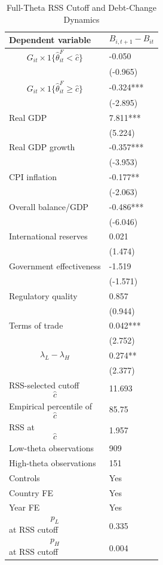 \begin{table}[H]\centering
\begin{threeparttable}
\caption{Full-Theta RSS Cutoff and Debt-Change Dynamics}
\label{tab:deltaB_rss_cutoff_fulltheta}
\scriptsize
\begin{tabularx}{\textwidth}{lY}
\toprule
Dependent variable & $$B_{i,t+1}-B_{it}$$ \\
\midrule
$$G_{it}\times 1\{\widehat{\theta}^{F}_{it}<\widehat{c}\}$$ & -0.050 \\
 & (-0.965) \\
$$G_{it}\times 1\{\widehat{\theta}^{F}_{it}\geq\widehat{c}\}$$ & -0.324*** \\
 & (-2.895) \\
Real GDP & 7.811*** \\
 & (5.224) \\
Real GDP growth & -0.357*** \\
 & (-3.953) \\
CPI inflation & -0.177** \\
 & (-2.063) \\
Overall balance/GDP & -0.486*** \\
 & (-6.046) \\
International reserves & 0.021 \\
 & (1.474) \\
Government effectiveness & -1.519 \\
 & (-1.571) \\
Regulatory quality & 0.857 \\
 & (0.944) \\
Terms of trade & 0.042*** \\
 & (2.752) \\
$$\lambda_L-\lambda_H$$ & 0.274** \\
 & (2.377) \\
\midrule
RSS-selected cutoff $$\widehat{c}$$ & 11.693 \\
Empirical percentile of $$\widehat{c}$$ & 85.75 \\
RSS at $$\widehat{c}$$ & 1.957 \\
Low-theta observations & 909 \\
High-theta observations & 151 \\
Controls & Yes \\
Country FE & Yes \\
Year FE & Yes \\
$$p_L$$ at RSS cutoff & 0.335 \\
$$p_H$$ at RSS cutoff & 0.004 \\

\end{tabularx}
\end{threeparttable}
\end{table}
